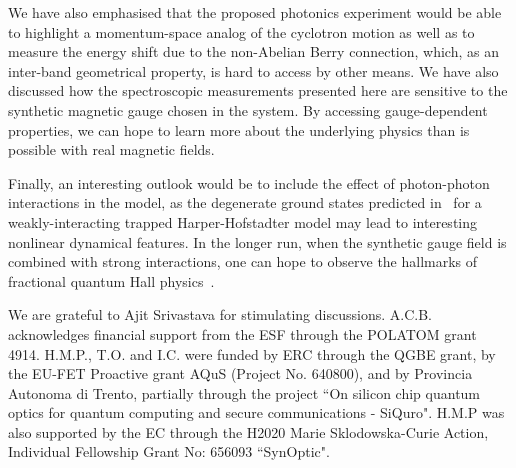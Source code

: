 \documentclass[twocolumn, 10pt, aps, superscriptaddress, floatfix, showpacs, pra, citeautoscript]{revtex4-1}
\begin{document}
We have also emphasised that the proposed photonics experiment would be able to highlight a momentum-space analog of the cyclotron motion as well as to measure the energy shift due to the non-Abelian Berry connection, which, as an inter-band geometrical property, is hard to access by other means. We have also discussed how the spectroscopic measurements presented here are sensitive to the synthetic magnetic gauge chosen in the system. By accessing gauge-dependent properties, we can hope to learn more about the underlying physics than is possible with real magnetic fields.

Finally, an interesting outlook would be to include the effect of photon-photon interactions in the model, as the degenerate ground states predicted in~\cite{ozawa2014momhh} for a weakly-interacting trapped Harper-Hofstadter model may lead to interesting nonlinear dynamical features. In the longer run, when the synthetic gauge field is combined with strong interactions, one can hope to observe the hallmarks of fractional quantum Hall physics~\cite{umucalilar2012fractional,hafezi2013non}.


\acknowledgments

We are grateful to Ajit Srivastava for stimulating discussions. A.C.B. acknowledges financial support from the ESF through the POLATOM grant 4914. H.M.P., T.O. and I.C. were funded by ERC through the QGBE grant, by the EU-FET Proactive grant AQuS (Project No. 640800), and by Provincia Autonoma di Trento, partially through the project ``On silicon chip quantum optics for quantum computing and secure communications - SiQuro". H.M.P was also supported by the EC through the H2020 Marie Sklodowska-Curie Action, Individual Fellowship Grant No: 656093 ``SynOptic".



\end{document}
